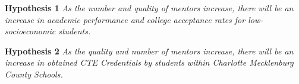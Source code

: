 \textbf{Hypothesis 1} \textit{As the number and quality of mentors increase, there will be an increase in academic performance and college acceptance rates for low-socioeconomic students.}




\textbf{Hypothesis 2} \textit{As the quality and number of mentors increase, there will be an increase in obtained CTE Credentials by students within Charlotte Mecklenburg County Schools.}

